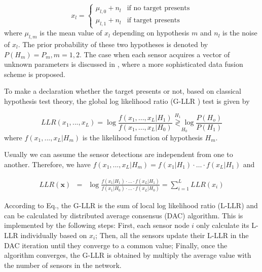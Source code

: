 \begin{equation}
x_{l}=\begin{cases}
\mu_{l,0}+n_{l} & \mbox{if no target presents}\\
\mu_{l,1}+n_{l} & \mbox{if target presents}
\end{cases}
\end{equation}
where $\mu_{l,m}$ is the mean value of $x_{l}$ depending on hypothesis
$m$ and $n_{l}$ is the noise of $x_{l}$. The prior probability
of these two hypotheses is denoted by $P\left(H_{m}\right)=P_{m},m=1,2$.
The case when each sensor acquires a vector of unknown parameters
is discussed in \cite{Xiao2005}, where a more sophisticated data
fusion scheme is proposed.   

To make a declaration whether the target presents or not, based on
classical hypothesis test theory, the global log likelihood ratio
(G-LLR ) test is given by 

\begin{equation}
LLR(x_{1},...,x_{L})=\log\frac{f\left(x_{1},...,x_{L}|H_{1}\right)}{f\left(x_{1},...,x_{L}|H_{0}\right)}\underset{H_{0}}{\overset{H_{1}}{\gtrless}\log}\frac{P\left(H_{o}\right)}{P\left(H_{1}\right)}\label{eq:G-LLR define}
\end{equation}
where $f\left(x_{1},...,x_{L}|H_{m}\right)$ is the likelihood function
of hypothesis $H_{m}$.

Usually  we can assume the sensor detections are independent from
one to another. Therefore, we have $f\left(x_{1},...,x_{L}|H_{m}\right)=f\left(x_{1}|H_{1}\right)\cdot\ldots\cdot f\left(x_{L}|H_{1}\right)$
and 

\begin{eqnarray}
LLR(\mathbf{x}) & = & \log\frac{f\left(x_{1}|H_{1}\right)\cdot\ldots\cdot f\left(x_{L}|H_{1}\right)}{f\left(x_{1}|H_{0}\right)\cdot\ldots\cdot f\left(x_{L}|H_{0}\right)}=\sum_{i=1}^{L}LLR\left(x_{i}\right)\label{eq:Sum_L_LLR}
\end{eqnarray}


According to Eq., the G-LLR is the sum of local
log likelihood ratio (L-LLR) and can be calculated by distributed
average consensus (DAC) algorithm. This is implemented by the following
steps: First, each sensor node $i$ only calculate its L-LLR individually
based on $x_{i}$; Then, all the sensors update their L-LLR in the
DAC iteration until they converge to a common value; Finally, once
the algorithm converges, the G-LLR is obtained by multiply the average
value with the number of sensors in the network.


